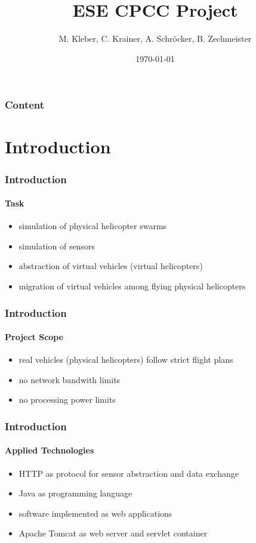 \documentclass{beamer}
\title{ESE CPCC Project}
\author{M. Kleber, C. Krainer, A. Schr\"ocker, B. Zechmeister}
\institute[University of Salzburg]
{
Department of Computer Sciences\\
  University of Salzburg, Austria
}
\date{\today}
\begin{document}
\begin{frame}
	\titlepage
\end{frame}

\begin{frame}
	\frametitle{Content}
	\tableofcontents
\end{frame}


\section{Introduction}

\begin{frame}\frametitle{Introduction}\framesubtitle{Task}
	\begin{itemize}
		\item simulation of physical helicopter swarms
		\item simulation of sensors
		\item abstraction of virtual vehicles (virtual helicopters)
		\item migration of virtual vehicles among flying physical helicopters
	\end{itemize} 
\end{frame}

\begin{frame}\frametitle{Introduction}\framesubtitle{Project Scope}
	\begin{itemize}
		\item real vehicles (physical helicopters) follow strict flight plans
		\item no network bandwith limits
		\item no processing power limits
	\end{itemize} 
\end{frame}

\begin{frame}\frametitle{Introduction}\framesubtitle{Applied Technologies}
	\begin{itemize}
		\item HTTP as protocol for sensor abstraction and data exchange
		\item Java as programming language
		\item software implemented as web applications
		\item Apache Tomcat as web server and servlet container
	\end{itemize} 
\end{frame}
\end{document}
